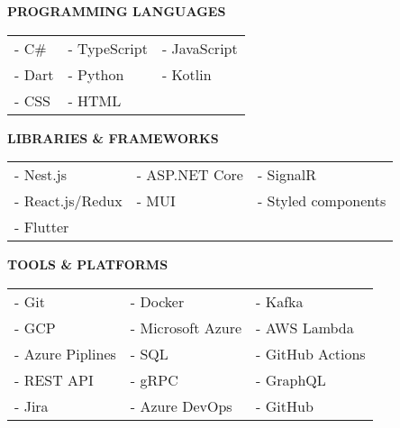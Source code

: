 \documentclass[10pt,a4paper,ragged2e]{altacv}
\begin{document}
\divider



\smallskip

\textcolor{VividPurple}{\textbf{PROGRAMMING LANGUAGES}}
\medskip

\begin{tabular}{ l l l }
	- C\#  & - TypeScript & - JavaScript \\
	- Dart & - Python     & - Kotlin     \\
	- CSS  & - HTML            			 \\
\end{tabular}

\smallskip
\divider

\textcolor{VividPurple}{\textbf{LIBRARIES \& FRAMEWORKS}}
\medskip

\begin{tabular}{ l l l } 
	- Nest.js        & - ASP.NET Core & - SignalR           \\
	- React.js/Redux & - MUI          & - Styled components \\ 
	- Flutter
\end{tabular}

\smallskip
\divider

\textcolor{VividPurple}{\textbf{TOOLS \& PLATFORMS}}
\medskip

\begin{tabular}{ l l l }
	- Git            & - Docker          & - Kafka          \\
	- GCP            & - Microsoft Azure & - AWS Lambda     \\
	- Azure Piplines & - SQL             & - GitHub Actions \\
	- REST API       & - gRPC            & - GraphQL        \\
	- Jira           & - Azure DevOps    & - GitHub         \\ 
\end{tabular}
\smallskip

\smallskip
\end{document}
